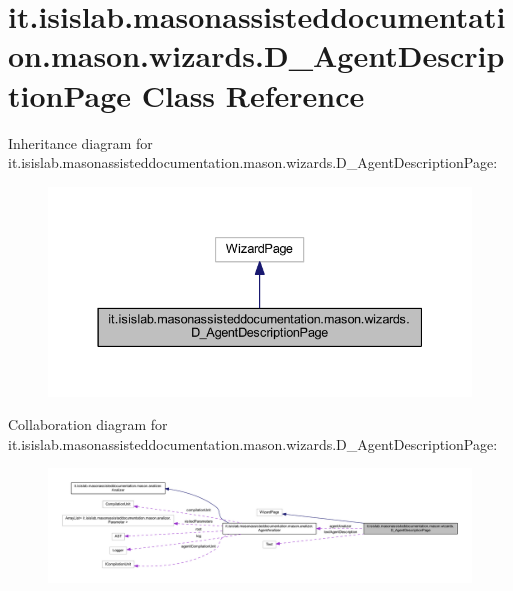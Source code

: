 \hypertarget{classit_1_1isislab_1_1masonassisteddocumentation_1_1mason_1_1wizards_1_1_d___agent_description_page}{\section{it.\-isislab.\-masonassisteddocumentation.\-mason.\-wizards.\-D\-\_\-\-Agent\-Description\-Page Class Reference}
\label{classit_1_1isislab_1_1masonassisteddocumentation_1_1mason_1_1wizards_1_1_d___agent_description_page}
}


Inheritance diagram for it.\-isislab.\-masonassisteddocumentation.\-mason.\-wizards.\-D\-\_\-\-Agent\-Description\-Page\-:
\nopagebreak
\begin{figure}[H]
\begin{center}
\leavevmode
\includegraphics[width=337pt]{classit_1_1isislab_1_1masonassisteddocumentation_1_1mason_1_1wizards_1_1_d___agent_description_page__inherit__graph}
\end{center}
\end{figure}


Collaboration diagram for it.\-isislab.\-masonassisteddocumentation.\-mason.\-wizards.\-D\-\_\-\-Agent\-Description\-Page\-:
\nopagebreak
\begin{figure}[H]
\begin{center}
\leavevmode
\includegraphics[width=350pt]{classit_1_1isislab_1_1masonassisteddocumentation_1_1mason_1_1wizards_1_1_d___agent_description_page__coll__graph}
\end{center}
\end{figure}
